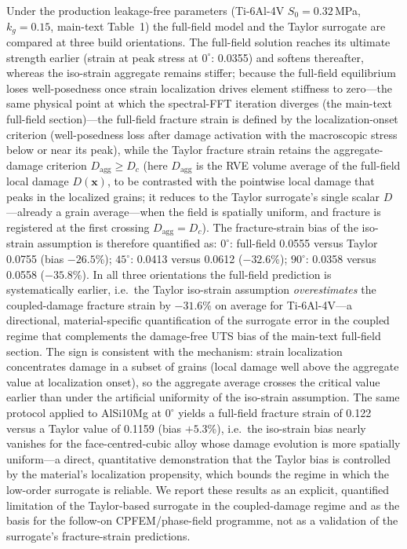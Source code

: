 \documentclass[12pt,a4paper,twocolumn]{article}
\providecommand{\ang}[1]{\ensuremath{#1^{\circ}}}
\begin{document}
Under the production leakage-free parameters (Ti-6Al-4V $S_0 = 0.32$\,MPa, $k_g = 0.15$, main-text Table~1) the full-field model and the Taylor surrogate are compared at three build orientations. The full-field solution reaches its ultimate strength earlier (strain at peak stress at $\ang{0}$: 0.0355) and softens thereafter, whereas the iso-strain aggregate remains stiffer; because the full-field equilibrium loses well-posedness once strain localization drives element stiffness to zero---the same physical point at which the spectral-FFT iteration diverges (the main-text full-field section)---the full-field fracture strain is defined by the localization-onset criterion (well-posedness loss after damage activation with the macroscopic stress below or near its peak), while the Taylor fracture strain retains the aggregate-damage criterion $D_{\mathrm{agg}} \ge D_c$ (here $D_{\mathrm{agg}}$ is the RVE volume average of the full-field local damage $D(\mathbf{x})$, to be contrasted with the pointwise local damage that peaks in the localized grains; it reduces to the Taylor surrogate's single scalar $D$---already a grain average---when the field is spatially uniform, and fracture is registered at the first crossing $D_{\mathrm{agg}}=D_c$). The fracture-strain bias of the iso-strain assumption is therefore quantified as: $\ang{0}$: full-field 0.0555 versus Taylor 0.0755 (bias $-26.5$\%); $\ang{45}$: 0.0413 versus 0.0612 ($-32.6$\%); $\ang{90}$: 0.0358 versus 0.0558 ($-35.8$\%). In all three orientations the full-field prediction is systematically earlier, i.e.\ the Taylor iso-strain assumption \emph{overestimates} the coupled-damage fracture strain by $-31.6$\% on average for Ti-6Al-4V---a directional, material-specific quantification of the surrogate error in the coupled regime that complements the damage-free UTS bias of the main-text full-field section. The sign is consistent with the mechanism: strain localization concentrates damage in a subset of grains (local damage well above the aggregate value at localization onset), so the aggregate average crosses the critical value earlier than under the artificial uniformity of the iso-strain assumption. The same protocol applied to AlSi10Mg at $\ang{0}$ yields a full-field fracture strain of 0.122 versus a Taylor value of 0.1159 (bias $+5.3$\%), i.e.\ the iso-strain bias nearly vanishes for the face-centred-cubic alloy whose damage evolution is more spatially uniform---a direct, quantitative demonstration that the Taylor bias is controlled by the material's localization propensity, which bounds the regime in which the low-order surrogate is reliable. We report these results as an explicit, quantified limitation of the Taylor-based surrogate in the coupled-damage regime and as the basis for the follow-on CPFEM/phase-field programme, not as a validation of the surrogate's fracture-strain predictions.
\end{document}

